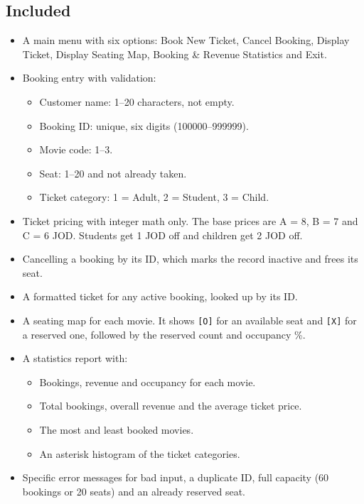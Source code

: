 \documentclass{thesis-library}
\begin{document}
\subsection*{Included}
\begin{itemize}
  \item A main menu with six options: Book New Ticket, Cancel Booking, Display Ticket, Display
        Seating Map, Booking \& Revenue Statistics and Exit.
  \item Booking entry with validation:
  \begin{itemize}
    \item Customer name: 1--20 characters, not empty.
    \item Booking ID: unique, six digits (100000--999999).
    \item Movie code: 1--3.
    \item Seat: 1--20 and not already taken.
    \item Ticket category: 1 = Adult, 2 = Student, 3 = Child.
  \end{itemize}
  \item Ticket pricing with integer math only. The base prices are A = 8, B = 7 and C = 6 JOD.
        Students get 1 JOD off and children get 2 JOD off.
  \item Cancelling a booking by its ID, which marks the record inactive and frees its seat.
  \item A formatted ticket for any active booking, looked up by its ID.
  \item A seating map for each movie. It shows \texttt{[O]} for an available seat and \texttt{[X]} for a reserved
        one, followed by the reserved count and occupancy \%.
  \item A statistics report with:
  \begin{itemize}
    \item Bookings, revenue and occupancy for each movie.
    \item Total bookings, overall revenue and the average ticket price.
    \item The most and least booked movies.
    \item An asterisk histogram of the ticket categories.
  \end{itemize}
  \item Specific error messages for bad input, a duplicate ID, full capacity (60 bookings or
        20 seats) and an already reserved seat.
\end{itemize}
\end{document}
